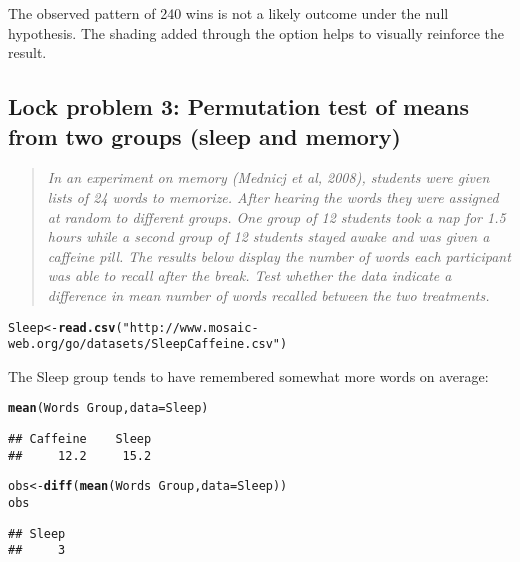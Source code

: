 \documentclass[11pt]{article}\usepackage[]{graphicx}\usepackage[]{color}
\makeatletter
\newcommand{\hlstr}[1]{\textcolor[rgb]{0.192,0.494,0.8}{#1}}%
\newcommand{\hlopt}[1]{\textcolor[rgb]{0,0,0}{#1}}%
\newcommand{\hlstd}[1]{\textcolor[rgb]{0.345,0.345,0.345}{#1}}%
\newcommand{\hlkwb}[1]{\textcolor[rgb]{0.69,0.353,0.396}{#1}}%
\newcommand{\hlkwc}[1]{\textcolor[rgb]{0.333,0.667,0.333}{#1}}%
\newcommand{\hlkwd}[1]{\textcolor[rgb]{0.737,0.353,0.396}{\textbf{#1}}}%
\newenvironment{kframe}{%
 \def\at@end@of@kframe{}%
 \ifinner\ifhmode%
  \def\at@end@of@kframe{\end{minipage}}%
  \begin{minipage}{\columnwidth}%
 \fi\fi%
 \def\FrameCommand##1{\hskip\@totalleftmargin \hskip-\fboxsep
 \colorbox{shadecolor}{##1}\hskip-\fboxsep
     \hskip-\linewidth \hskip-\@totalleftmargin \hskip\columnwidth}%
 \MakeFramed {\advance\hsize-\width
   \@totalleftmargin\z@ \linewidth\hsize
   \@setminipage}}%
 {\par\unskip\endMakeFramed%
 \at@end@of@kframe}
\newenvironment{knitrout}{}{} %
\makeatother
\begin{document}
The observed pattern of 240 wins is not a likely outcome under the null hypothesis.
The shading added through the  option helps to visually reinforce the result.



\subsection*{Lock problem 3: Permutation test of means from two groups (sleep and memory)} 

\begin{quotation}
 {\em In an experiment on memory (Mednicj et al, 2008), students were given lists of 24 words
  to memorize.  After hearing the words they were assigned at random
  to different groups. One group of 12 students took a nap for 1.5
  hours while a second group of 12 students stayed awake and was given
  a caffeine pill.  The results below display the number of words each
  participant was able to recall after the break.  Test whether the
  data indicate a difference in mean number of words recalled between
  the two treatments.}
\end{quotation}
\begin{knitrout}
\color{fgcolor}\begin{kframe}
\begin{alltt}
\hlstd{Sleep} \hlkwb{<-} \hlkwd{read.csv}\hlstd{(}\hlstr{"http://www.mosaic-web.org/go/datasets/SleepCaffeine.csv"}\hlstd{)}
\end{alltt}
\end{kframe}
\end{knitrout}

The Sleep group tends to have remembered somewhat more words on average:
\begin{knitrout}
\color{fgcolor}\begin{kframe}
\begin{alltt}
\hlkwd{mean}\hlstd{(Words} \hlopt{~} \hlstd{Group,} \hlkwc{data} \hlstd{= Sleep)}
\end{alltt}
\begin{verbatim}
## Caffeine    Sleep 
##     12.2     15.2
\end{verbatim}
\begin{alltt}
\hlstd{obs} \hlkwb{<-} \hlkwd{diff}\hlstd{(}\hlkwd{mean}\hlstd{(Words} \hlopt{~} \hlstd{Group,} \hlkwc{data} \hlstd{= Sleep))}
\hlstd{obs}
\end{alltt}
\begin{verbatim}
## Sleep 
##     3
\end{verbatim}
\end{kframe}
\end{knitrout}
\end{document}
